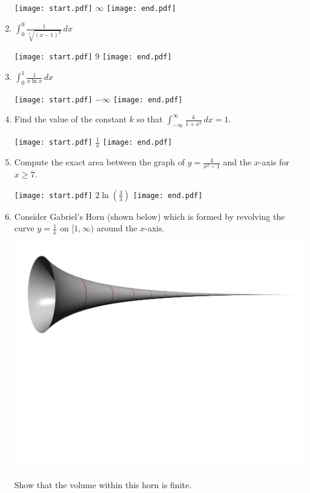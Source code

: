 \documentclass[12pt]{article}
\begin{document}
\begin{enumerate}
\texttt{[image: start.pdf]}
{{$\infty$}}
\texttt{[image: end.pdf]}


\item $\int_0^9 \frac{1}{\sqrt[3]{(x-1)^2}} \,dx$

\texttt{[image: start.pdf]}
{{9}}
\texttt{[image: end.pdf]}


\item $\int_{0}^{1}\frac{1}{x\ln{x}}\,dx$ 

\texttt{[image: start.pdf]}
{{$-\infty$}}
\texttt{[image: end.pdf]}


\item Find the value of the constant $k$ so that $\int_{-\infty}^{\infty} \frac{k}{1+x^2} \,dx=1$.

\texttt{[image: start.pdf]}
{{$\frac{1}{\pi}$}}
\texttt{[image: end.pdf]}


\item Compute the exact area between the graph of $y=\frac{4}{x^2-1}$ and the $x$-axis for $x \geq 7$.

\texttt{[image: start.pdf]}
{{$2\ln{\left(\frac{4}{3}\right)}$}}
\texttt{[image: end.pdf]}


\item Consider Gabriel's Horn (shown below) which is formed by revolving the curve $y=\frac{1}{x}$ on $[1,\infty)$ around the $x$-axis.

\begin{center}
\includegraphics[scale=0.6]{GabrielHorn.pdf}
\end{center}

Show that the volume within this horn is finite.


\end{enumerate}
\end{document}
